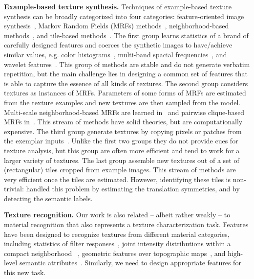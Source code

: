 \documentclass[10pt,twocolumn,letterpaper]{article}
\begin{document}
\textbf{Example-based texture synthesis.}  Techniques of example-based
texture synthesis can be broadly categorized into four categories:
feature-oriented image synthesis~\cite{Heeger:95, Debonet:97,
  Portilla:2000:IJCV, random:phase}, Markov Random Fields (MRFs)
methods~\cite{paget:tip98, zhu:frame, Zalesny05}, neighborhood-based
methods~\cite{Efros:sig2001, Kwatra:2003, Kwatra:tog:2005,
  dai:facade:iccv13}, and tile-based methods~\cite{Cohen:2003:wang,
  Liu:2004:NTA}.  The first group learns statistics of a brand of
carefully designed features and coerces the synthetic images to
have/achieve similar values, e.g. color histograms~\cite{Heeger:95},
multi-band spacial frequencies~\cite{Debonet:97}, and wavelet
features~\cite{Portilla:2000:IJCV}. This group of methods are stable
and do not generate verbatim repetition, but the main challenge lies
in designing a common set of features that is able to capture the
essence of all kinds of textures.  The second group considers textures
as instances of MRFs. Parameters of some forms of MRFs are estimated
from the texture examples and new textures are then sampled from the
model. Multi-scale neighborhood-based MRFs are learned
in~\cite{paget:tip98} and pairwise clique-based MRFs
in~\cite{Zalesny05}. This stream of methods have solid theories, but
are computationally expensive. The third group generate textures by
copying pixels or patches from the exemplar inputs~\cite{Efros:1999,
  Efros:sig2001, Kwatra:2003, Kwatra:tog:2005,
  dai:facade:iccv13}. Unlike the first two groups they do not provide
cues for texture analysis, but this group are often more efficient and
tend to work for a larger variety of textures. The last group assemble
new textures out of a set of (rectangular) tiles cropped from example
images. This stream of methods are very efficient once the tiles are
estimated. However, identifying these tiles is non-trivial:
\cite{liu:ijcv:05} handled this problem by estimating the translation
symmetries, and \cite{dai:facade:iccv13} by detecting the semantic
labels.

\textbf{Texture recognition.}  Our work is also related -- albeit
rather weakly -- to material recognition that also represents a
texture characterization task. Features have been designed to
recognize textures from different material categories, including
statistics of filter responses~\cite{texton:2001, Manjunath96,
  Schmid01}, joint intensity distributions within a compact
neighborhood ~\cite{material:pami:09, sorted:texture}, geometric
features over topographic maps~\cite{xia:texture}, and high-level
semantic attributes~\cite{semantic:texture, texture:wild}.  Similarly,
we need to design appropriate features for this new task.
\end{document}
